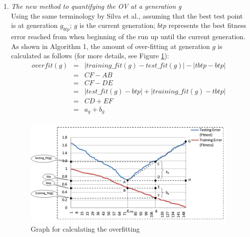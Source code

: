 \begin{enumerate}
\begin{enumerate}
\item \textit{The new method to quantifying the OV at a generation g}\\
Using the same terminology by Silva et al., assuming that the best test point is at generation ${g}_{btp}$; $g$ is the current generation; $btp$ represents the best fitness error reached from when beginning of the run up until the current generation. As shown in Algorithm 1, the amount of over-fitting at generation $g$ is calculated as follows (for more details, see Figure \ref{fig:OV}):
\begin{eqnarray}
overfit(g)&=&{|training\_fit(g)-test\_fit(g)| - |tbtp-btp|} \nonumber\\
		  &=& {CF-AB}	\nonumber\\
          &=& {CF-DE}	\nonumber\\
		  &=& {|test\_fit(g) - btp|+|training\_fit(g)- tbtp|} \nonumber\\
		  &=& {CD+EF}  \nonumber\\
		  &=& {a_{g}+b_{g}}  \nonumber\\
\end{eqnarray}

\begin{figure}
\centering
\includegraphics[scale=0.4]{Figures/Fig3_4.png}
\caption{Graph for calculating the overfitting}
\label{fig:OV}       %
\end{figure}


\end{enumerate}
\end{enumerate}

